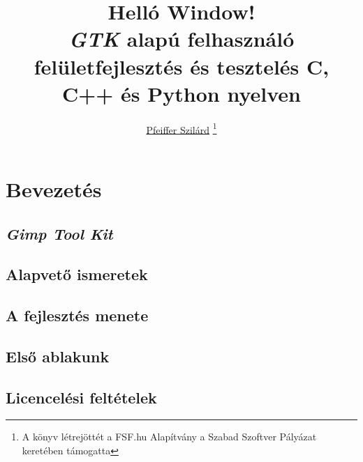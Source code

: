 \documentclass[a4paper, titlepage]{report}
\author{
\href{http://pfeifferszilard.hu}{Pfeiffer Szilárd}
\thanks{A könyv létrejöttét a FSF.hu Alapítvány a Szabad Szoftver Pályázat\cite{fsftender2011} keretében támogatta}
}
\title{
Helló Window!\\\medskip
\large{\textit{GTK} alapú felhasználó felületfejlesztés és tesztelés C, C++ és Python nyelven}
}
\begin{document}
\maketitle

\tableofcontents
\newpage
{}

\part{Bevezetés}

\chapter{\textit{Gimp Tool Kit}}


\chapter{Alapvető ismeretek}


\chapter{A fejlesztés menete}


\chapter{Első ablakunk}

%
%
%
%
%
%
%

\appendix

\chapter{Licencelési feltételek}
\end{document}
